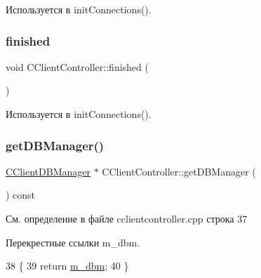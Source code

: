 Используется в init\+Connections().

\hypertarget{class_c_client_controller_a04a024fdb1135b1b5dec86b006511672}{}\label{class_c_client_controller_a04a024fdb1135b1b5dec86b006511672} 
\subsubsection{\texorpdfstring{finished}{finished}}
{\footnotesize\ttfamily void C\+Client\+Controller\+::finished (\begin{DoxyParamCaption}{ }\end{DoxyParamCaption})\hspace{0.3cm}{\ttfamily [signal]}}



Используется в init\+Connections().

\hypertarget{class_c_client_controller_a456359547ec2e4225d54daeb6463008b}{}\label{class_c_client_controller_a456359547ec2e4225d54daeb6463008b} 
\subsubsection{\texorpdfstring{get\+D\+B\+Manager()}{getDBManager()}}
{\footnotesize\ttfamily \hyperlink{class_c_client_d_b_manager}{C\+Client\+D\+B\+Manager} $\ast$ C\+Client\+Controller\+::get\+D\+B\+Manager (\begin{DoxyParamCaption}{ }\end{DoxyParamCaption}) const}



См. определение в файле cclientcontroller.\+cpp строка 37



Перекрестные ссылки m\+\_\+dbm.


\begin{DoxyCode}
38 \{
39     \textcolor{keywordflow}{return} \hyperlink{class_c_client_controller_aacc71f5de726af350427a5eaedd6cf6c}{m\_dbm};
40 \}
\end{DoxyCode}
\hypertarget{class_c_client_controller_a07441870867b13d7c867e57244101f92}{}\label{class_c_client_controller_a07441870867b13d7c867e57244101f92} 
